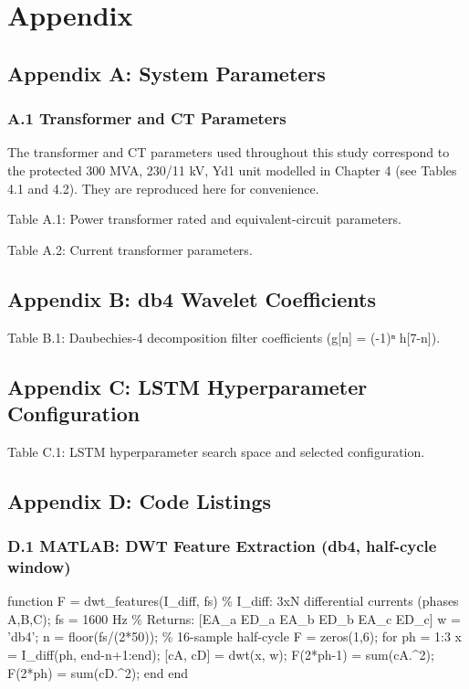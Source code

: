 \chapter{Appendix}
\label{ch:appendix}


\section{Appendix A: System Parameters}

\subsection{A.1  Transformer and CT Parameters}
The transformer and CT parameters used throughout this study correspond to the protected 300 MVA, 230/11 kV, Yd1 unit modelled in Chapter 4 (see Tables 4.1 and 4.2). They are reproduced here for convenience.

Table A.1: Power transformer rated and equivalent-circuit parameters.

Table A.2: Current transformer parameters.


\section{Appendix B: db4 Wavelet Coefficients}
Table B.1: Daubechies-4 decomposition filter coefficients (g[n] = (-1)ⁿ h[7-n]).


\section{Appendix C: LSTM Hyperparameter Configuration}
Table C.1: LSTM hyperparameter search space and selected configuration.


\section{Appendix D: Code Listings}

\subsection{D.1  MATLAB: DWT Feature Extraction (db4, half-cycle window)}
function F = dwt\_features(I\_diff, fs)
\% I\_diff: 3xN differential currents (phases A,B,C); fs = 1600 Hz
\% Returns: [EA\_a ED\_a EA\_b ED\_b EA\_c ED\_c]
  w = 'db4'; n = floor(fs/(2*50));        \% 16-sample half-cycle
  F = zeros(1,6);
  for ph = 1:3
    x = I\_diff(ph, end-n+1:end);
    [cA, cD] = dwt(x, w);
    F(2*ph-1) = sum(cA.^2); F(2*ph) = sum(cD.^2);
  end
end


